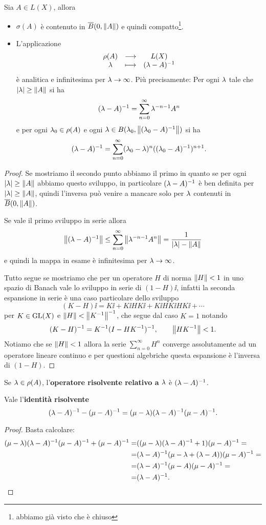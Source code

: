 \begin{proposition}[]\label{PrProprietaSpettro}
Sia $A\in L(X)$, allora
\begin{itemize}
    \item $\sigma(A)$ \`e contenuto in $\overline{B}(0,\left\Vert{A}\right\Vert)$ e quindi compatto\footnote{abbiamo gi\`a visto che \`e chiuso}.
    \item L'applicazione
    \[\begin{array}{ccc} {\rho(A)} & \longrightarrow & {L(X)}\\ {\lambda} & \longmapsto & {(\lambda-A)^{-1}} \end{array}\]
    \`e analitica e infinitesima per $\lambda\to \infty$. Pi\`u precisamente: Per ogni $\lambda$ tale che $\left|{\lambda}\right|\geq \left\Vert{A}\right\Vert$ si ha
    \[(\lambda-A)^{-1}=\sum_{n=0}^\infty \lambda^{-n-1}A^n\]
    e per ogni $\lambda_0\in \rho(A)$ e ogni $\lambda\in B(\lambda_0,\left\Vert{(\lambda_0-A)^{-1}}\right\Vert)$ si ha
    \[(\lambda-A)^{-1}=\sum_{n=0}^\infty (\lambda_0-\lambda)^n((\lambda_0-A)^{-1})^{n+1}.\]
\end{itemize}
\end{proposition}
\begin{proof}
Se mostriamo il secondo punto abbiamo il primo in quanto se per ogni $\left|{\lambda}\right|\geq \left\Vert{A}\right\Vert$ abbiamo questo sviluppo, in particolare $(\lambda-A)^{-1}$ \`e ben definita per $\left|{\lambda}\right|\geq \left\Vert{A}\right\Vert$, quindi l'inversa pu\`o venire a mancare solo per $\lambda$ contenuti in $\overline{B}(0,\left\Vert{A}\right\Vert)$.

Se vale il primo sviluppo in serie allora
\[\left\Vert{(\lambda-A)^{-1}}\right\Vert\leq \sum_{n=0}^\infty \left\Vert{\lambda^{-n-1}A^n}\right\Vert=\frac1{\left|{\lambda}\right|-\left\Vert{A}\right\Vert}\]
e quindi la mappa in esame \`e infinitesima per $\lambda\to \infty$.
\medskip

Tutto segue se mostriamo che per un operatore $H$ di norma $\left\Vert{H}\right\Vert<1$ in uno spazio di Banach vale lo sviluppo in serie di $(1-H)\ii$, infatti la seconda espansione in serie \`e una caso particolare dello sviluppo
\[(K-H)\ii=K\ii+K\ii H K\ii+K\ii HK\ii H K\ii+\cdots\]
per $K\in \mathrm{GL}(X)$ e $\left\Vert{H}\right\Vert<\left\Vert{K^{-1}}\right\Vert^{-1}$, che segue dal caso $K=1$ notando
\[(K-H)^{-1}=K^{-1}(I-HK^{-1})^{-1},\qquad \left\Vert{H K^{-1}}\right\Vert<1.\]
Notiamo che se $\left\Vert{H}\right\Vert<1$ allora la serie $\sum_{n=0}^\infty H^n$ converge assolutamente ad un operatore lineare continuo e per questioni algebriche questa espansione \`e l'inversa di $(1-H)$.
\end{proof}


\begin{definition}
Se $\lambda\in \rho(A)$, l'\textbf{operatore risolvente relativo a $\lambda$} \`e $(\lambda-A)^{-1}$.
\end{definition}

\begin{remark}
Vale l'\textbf{identit\`a risolvente}
\[(\lambda-A)^{-1}-(\mu-A)^{-1}=(\mu-\lambda)(\lambda-A)^{-1}(\mu-A)^{-1}.\]
\end{remark}
\begin{proof}
Basta calcolare:
\begin{align*}
    (\mu-\lambda)(\lambda-A)^{-1}(\mu-A)^{-1}+(\mu-A)^{-1}=&((\mu-\lambda)(\lambda-A)^{-1}+1)(\mu-A)^{-1}=\\
    =&(\lambda-A)^{-1}(\mu-\lambda+(\lambda-A))(\mu-A)^{-1}=\\
    =&(\lambda-A)^{-1}(\mu-A)(\mu-A)^{-1}=\\
    =&(\lambda-A)^{-1}.
\end{align*}
\end{proof}

